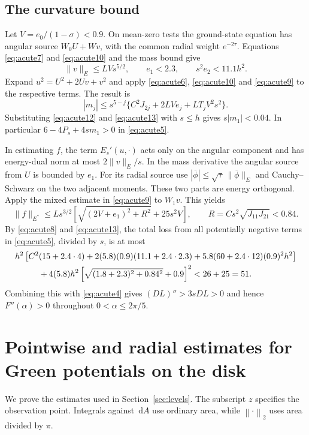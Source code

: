 \documentclass[11pt,a4paper,reqno]{amsart}
\theoremstyle{remark}
\numberwithin{equation}{section}
\newcommand{\dd}{\,\mathrm d}
\newcommand{\av}[1]{\overline{#1}}
\newcommand{\norm}[1]{\left\|#1\right\|_2}
\begin{document}
\subsection{The curvature bound}
Let $V=e_0/(1-\sigma)<0.9$. On mean-zero tests the ground-state equation has
angular source $W_0U+Wv$, with the common radial weight $e^{-2\tau}$.
Equations \eqref{eq:acute7} and \eqref{eq:acute10} and the mass bound give
\[
 \|v\|_E\le LV s^{5/2},\qquad e_1<2.3,\qquad s^2e_2<11.1h^2.
\]
Expand $u^2=U^2+2Uv+v^2$ and apply \eqref{eq:acute6}, \eqref{eq:acute10}
and \eqref{eq:acute9} to the respective terms. The result is
\[
 |m_j|\le s^{5-j}\{ C^2J_{2j}+2LV e_j+LT_jV^2s^2\}.
 \tag{A.11}\label{eq:acute13}
\]
Substituting \eqref{eq:acute12} and \eqref{eq:acute13} with $s\le h$ gives
$s|m_1|<0.04$. In particular $6-4P_s+4sm_1>0$ in \eqref{eq:acute5}.

In estimating $f$, the term $E_s'(u,\cdot)$ acts only on the angular
component and has energy-dual norm at most $2\|v\|_E/s$. In the mass
derivative the angular source from $U$ is bounded by $e_1$. For its radial
source use $|\av\phi|\le\sqrt\tau\,\|\av\phi\|_E$ and Cauchy--Schwarz on
the two adjacent moments. These two parts are energy orthogonal. Apply the
mixed estimate in \eqref{eq:acute9} to $W_1v$. This yields
\[
 \|f\|_{E^*}\le Ls^{3/2}
 \left[\sqrt{(2V+e_1)^2+R^2}+25s^2 V\right],\qquad
 R=Cs^2\sqrt{J_{11}J_{21}}<0.84 .
\]
By \eqref{eq:acute8} and \eqref{eq:acute13}, the total loss from all
potentially negative terms in \eqref{eq:acute5}, divided by $s$, is at most
\begin{align*}
 &h^2\left[C^2(15+2.4\cdot4)+2(5.8)(0.9)(11.1+2.4\cdot2.3)
  +5.8(60+2.4\cdot12)(0.9)^2h^2\right]\\
 &\hspace{10mm}{}+4(5.8)h^2
       \left[\sqrt{(1.8+2.3)^2+0.84^2}+0.9\right]^2 < 26+25=51 .
\end{align*}
Combining this with \eqref{eq:acute4} gives $(DL)''>3sDL>0$ and hence
$F''(\alpha)>0$ throughout $0<\alpha\le2\pi/5$.

\section{Pointwise and radial estimates for Green potentials on the disk}
\label{app:green}
We prove the estimates used in Section~\ref{sec:levels}. The subscript $z$
specifies the observation point. Integrals against $\dd A$ use ordinary
area, while $\norm{\cdot}$ uses area divided by $\pi$.
\end{document}

